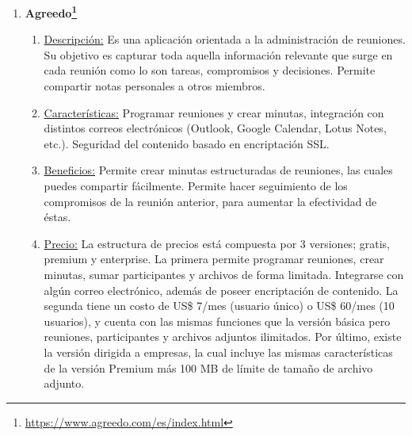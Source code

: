 \begin{enumerate}[1.]
\begin{enumerate}[a]
		\item \underline{Características:} Permite iniciar conversaciones en equipo, sea de forma anónima o no. También permite a los usuarios votar por los comentarios de los demás y filtrar los comentarios basados en estos votos ascendentes. Los usuarios pueden crear encuestas personalizadas para la respuesta del equipo y pueden organizar debates en diferentes grupos. 
	    \item \underline{Beneficios:} Con esta plataforma se puede obtener retroalimentación anónima o no y en línea. Permite destacar las buenas ideas que nacen de los equipos por medio de las votaciones. Este software fomenta tener menos reuniones, más efectivas y llegar a decisiones mejores y más informadas.
	    \item \underline{Precio:} Posee versión gratuita para grupos pequeños. Los grupos más grandes requieren una suscripción mensual. Versión gratis: hasta 10 usuarios, 1 GB de almacenamiento, encuestas y discusiones ilimitadas. Si requiere más capacidad tiene un costo de USD\$ 5 por usuario mensual, e incluye usuarios Ilimitados, almacenamiento de 20 GB, encuestas y discusiones ilimitadas. Por último, si aún se requiere mayor capacidad existe la versión a USD\$ 7 por usuarios mensual, que considera usuarios Ilimitados, almacenamiento de 20 GB, encuestas y discusiones ilimitadas.
    \end{enumerate}	    
    \item \textbf{Agreedo\footnote{\url{https://www.agreedo.com/es/index.html}}}
    \begin{enumerate}[a]
	    \item \underline{Descripción:} Es una aplicación orientada a la administración de reuniones. Su objetivo es capturar toda aquella información relevante que surge en cada reunión como lo son tareas, compromisos y decisiones. Permite compartir notas personales a otros miembros. 
		\item \underline{Características:} Programar reuniones y crear minutas, integración con distintos correos electrónicos (Outlook, Google Calendar, Lotus Notes, etc.). Seguridad del contenido basado en encriptación SSL. 
	    \item \underline{Beneficios:} Permite crear minutas estructuradas de reuniones, las cuales puedes compartir fácilmente. Permite hacer seguimiento de los compromisos de la reunión anterior, para aumentar la efectividad de éstas.
	    \item \underline{Precio:} La estructura de precios está compuesta por 3 versiones; gratis, premium y enterprise. La primera permite programar reuniones, crear minutas, sumar participantes y archivos de forma limitada. Integrarse con algún correo electrónico, además de poseer encriptación de contenido. La segunda tiene un costo de US\$ 7/mes (usuario único) o US\$ 60/mes (10 usuarios), y cuenta con las mismas funciones que la versión básica pero reuniones, participantes y archivos adjuntos ilimitados. Por último, existe la versión dirigida a empresas, la cual incluye las mismas características de la versión Premium más 100 MB de límite de tamaño de archivo adjunto.

\end{enumerate}
\end{enumerate}
